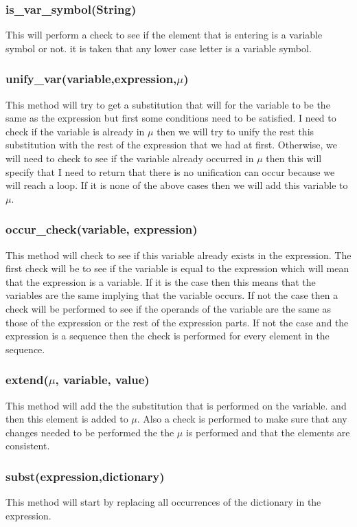 {\subsubsection{is\_var\_symbol(String)}
This will perform a check to see if the element that is entering is a variable symbol or not. it is taken that any lower case letter is a variable symbol.

\subsubsection{unify\_var(variable,expression,$\mu$)}
This method will try to get a substitution that will for the variable to be the same as the expression but first some conditions need to be satisfied. I need to check if the variable is already in $\mu$ then we will try to unify the rest this substitution with the rest of the expression that we had at first. Otherwise, we will need to check to see if the variable already occurred in $\mu$ then this will specify that I need to return that there is no unification can occur because we will reach a loop. If it is none of the above cases then we will add this variable to $\mu$.

\subsubsection{occur\_check(variable, expression)}
This method will check to see if this variable already exists in the expression. The first check will be to see if the variable is equal to the expression which will mean that the expression is a variable. If it is the case then this means that the variables are the same implying that the variable occurs. If not the case then a check will be performed to see if the operands of the variable are the same as those of the expression or the rest of the expression parts. If not the case and the expression is a sequence then the check is performed for every element in the sequence.

\subsubsection{extend($\mu$, variable, value) }
This method will add the the substitution that is performed on the variable. and then this element is added to $\mu$. Also a check is performed to make sure that any changes needed to be performed the the $\mu$ is performed and that the elements are consistent.

\subsubsection{subst(expression,dictionary)}
This method will start by replacing all occurrences of the dictionary in the expression.

}

